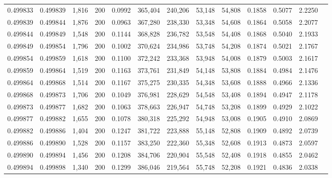 \begin{tabular}{rrrrrrrrrrrrr}
0.499833 & 0.499839 & 1,816 & 200 &                                     0.0992 & 365,404 & 240,206 &  53,148 &  54,808 & 0.1858 & 0.5077 & 2.2250 \\
0.499839 & 0.499844 & 1,876 & 200 &                                     0.0963 & 367,280 & 238,330 &  53,348 &  54,608 & 0.1864 & 0.5058 & 2.2077 \\
0.499844 & 0.499849 & 1,548 & 200 &                                     0.1144 & 368,828 & 236,782 &  53,548 &  54,408 & 0.1868 & 0.5040 & 2.1933 \\
0.499849 & 0.499854 & 1,796 & 200 &                                     0.1002 & 370,624 & 234,986 &  53,748 &  54,208 & 0.1874 & 0.5021 & 2.1767 \\
0.499854 & 0.499859 & 1,618 & 200 &                                     0.1100 & 372,242 & 233,368 &  53,948 &  54,008 & 0.1879 & 0.5003 & 2.1617 \\
0.499859 & 0.499864 & 1,519 & 200 &                                     0.1163 & 373,761 & 231,849 &  54,148 &  53,808 & 0.1884 & 0.4984 & 2.1476 \\
0.499864 & 0.499868 & 1,514 & 200 &                                     0.1167 & 375,275 & 230,335 &  54,348 &  53,608 & 0.1888 & 0.4966 & 2.1336 \\
0.499868 & 0.499873 & 1,706 & 200 &                                     0.1049 & 376,981 & 228,629 &  54,548 &  53,408 & 0.1894 & 0.4947 & 2.1178 \\
0.499873 & 0.499877 & 1,682 & 200 &                                     0.1063 & 378,663 & 226,947 &  54,748 &  53,208 & 0.1899 & 0.4929 & 2.1022 \\
0.499877 & 0.499882 & 1,655 & 200 &                                     0.1078 & 380,318 & 225,292 &  54,948 &  53,008 & 0.1905 & 0.4910 & 2.0869 \\
0.499882 & 0.499886 & 1,404 & 200 &                                     0.1247 & 381,722 & 223,888 &  55,148 &  52,808 & 0.1909 & 0.4892 & 2.0739 \\
0.499886 & 0.499890 & 1,528 & 200 &                                     0.1157 & 383,250 & 222,360 &  55,348 &  52,608 & 0.1913 & 0.4873 & 2.0597 \\
0.499890 & 0.499894 & 1,456 & 200 &                                     0.1208 & 384,706 & 220,904 &  55,548 &  52,408 & 0.1918 & 0.4855 & 2.0462 \\
0.499894 & 0.499898 & 1,340 & 200 &                                     0.1299 & 386,046 & 219,564 &  55,748 &  52,208 & 0.1921 & 0.4836 & 2.0338 \\

\end{tabular}
